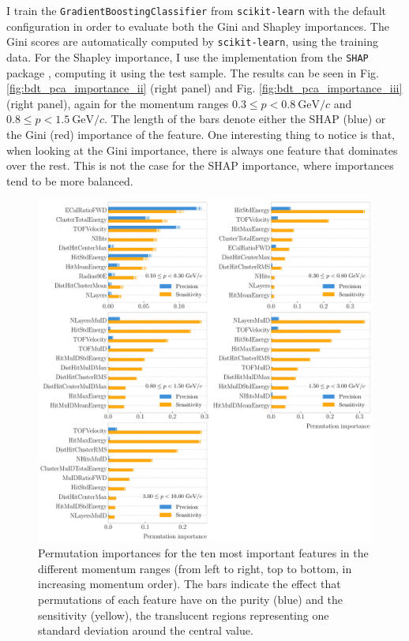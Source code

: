 I train the \texttt{GradientBoostingClassifier} from \texttt{scikit-learn} with the default configuration in order to evaluate both the Gini and Shapley importances. The Gini scores are automatically computed by \texttt{scikit-learn}, using the training data. For the Shapley importance, I use the implementation from the \texttt{SHAP} package \cite{SHAP2017}, computing it using the test sample. The results can be seen in Fig. \ref{fig:bdt_pca_importance_ii} (right panel) and Fig. \ref{fig:bdt_pca_importance_iii} (right panel), again for the momentum ranges $0.3 \leq p < 0.8 ~ \mathrm{GeV}/c$ and $0.8 \leq p < 1.5 ~ \mathrm{GeV}/c$. The length of the bars denote either the SHAP (blue) or the Gini (red) importance of the feature. One interesting thing to notice is that, when looking at the Gini importance, there is always one feature that dominates over the rest. This is not the case for the SHAP importance, where importances tend to be more balanced.

\begin{figure}[p]
	\centering
	\includegraphics[width=.99\linewidth]{Images/GArSoft_PID/BDT/summary_permutation.pdf}
	\caption[Permutation importances for the ten most important features in the different momentum ranges.]{Permutation importances for the ten most important features in the different momentum ranges (from left to right, top to bottom, in increasing momentum order). The bars indicate the effect that permutations of each feature have on the purity (blue) and the sensitivity (yellow), the translucent regions representing one standard deviation around the central value.}
	\label{fig:bdt_permutations}
\end{figure}

